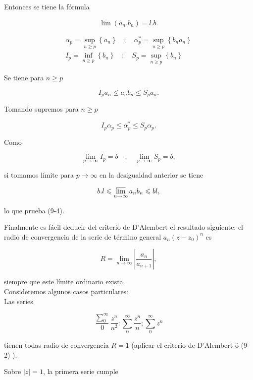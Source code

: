 \documentclass[10pt]{article}
\theoremstyle{plain}
\theoremstyle{definition}
\theoremstyle{remark}
\begin{document}
Entonces se tiene la fórmula


\begin{equation*}
\overline{\lim }\left(a_{n} . b_{n}\right)=l . b . \tag{9-4}
\end{equation*}


$$
\begin{gathered}
\alpha_{p}=\sup _{n \geqslant p}\left\{a_{n}\right\} \quad ; \quad \alpha_{p}^{*}=\sup _{n \geqslant p}\left\{b_{n} a_{n}\right\} \\
I_{p}=\inf _{n \geqslant p}\left\{b_{n}\right\} \quad ; \quad S_{p}=\sup _{n \geqslant p}\left\{b_{n}\right\}
\end{gathered}
$$

Se tiene para $n \geqslant p$


$$
I_{p} a_{n} \leqslant a_{n} b_{n} \leqslant S_{p} a_{n} .
$$

Tomando supremos para $n \geqslant p$

$$
I_{p} \alpha_{p} \leqslant \alpha_{p}^{*} \leqslant S_{p} \alpha_{p} .
$$

Como

$$
\lim _{p \rightarrow \infty} I_{p}=b \quad ; \quad \lim _{p \rightarrow \infty} S_{p}=b,
$$

si tomamos límite para $p \rightarrow \infty$ en la desigualdad anterior se tiene

$$
b . l \leqslant \varlimsup_{n \rightarrow \infty} a_{n} b_{n} \leqslant b l,
$$

lo que prueba (9-4).

Finalmente es fácil deducir del criterio de D'Alembert el resultado siguiente: el radio de convergencia de la serie de término general $a_{n}\left(z-z_{0}\right)^{n}$ es


\begin{equation*}
R=\lim _{n \rightarrow \infty}\left|\frac{a_{n}}{a_{n+1}}\right|, \tag{9-5}
\end{equation*}


siempre que este límite ordinario exista.\\
Consideremos algunos casos particulares:\\
Las series

$$
\frac{\sum_{0}^{\infty}}{0} \frac{z^{n}}{n^{2}}: \sum_{0}^{\infty} \frac{z^{n}}{n} ; \sum_{0}^{\infty} z^{n}
$$

tienen todas radio de convergencia $R=1$ (aplicar el criterio de D'Alembert ó (9-2) ).

Sobre $|z|=1$, la primera serie cumple
\end{document}
